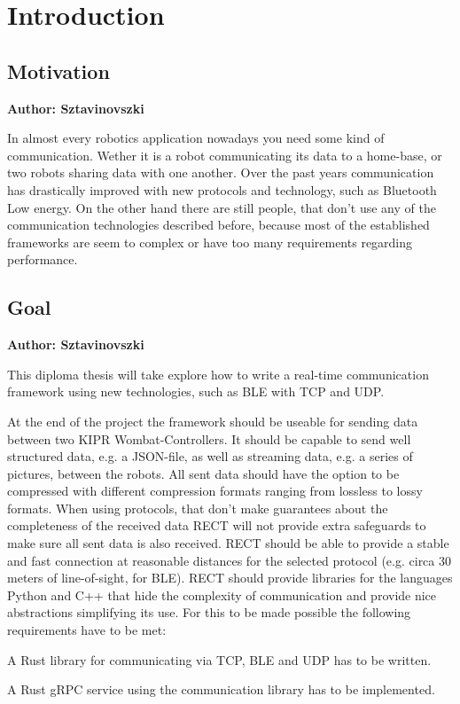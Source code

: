 \chapter{Introduction}


\vspace{2mm}

\section{Motivation}
\textbf{Author: Sztavinovszki}

In almost every robotics application nowadays you need some kind of communication. Wether it is a robot communicating
its data to a home-base, or two robots sharing data with one another. Over the past years communication has drastically
improved with new protocols and technology, such as Bluetooth Low energy. On the other hand there are still people, that
don't use any of the communication technologies described before, because most of the established frameworks are seem to
complex or have too many requirements regarding performance.

\section{Goal}
\textbf{Author: Sztavinovszki}

This diploma thesis will take explore how to write a real-time communication framework using new technologies, such as BLE with TCP
and UDP.

At the end of the project the framework should be useable for sending data between two KIPR Wombat-Controllers. It should be capable
to send well structured data, e.g. a JSON-file, as well as streaming data, e.g. a series of pictures, between the robots. All sent data should have the
option to be compressed with different compression formats ranging from lossless to lossy formats. When using protocols, that don't make guarantees about
the completeness of the received data RECT will not provide extra safeguards to make sure all sent data is also received.
RECT should be able to provide a stable and fast connection at reasonable distances for the selected protocol (e.g. circa 30 meters of line-of-sight, for BLE).
RECT should provide libraries for the languages Python and C++ that hide the complexity of communication and provide nice abstractions simplifying its use.
For this to be made possible the following requirements have to be met:
\begin{Things to be done}
\item A Rust library for communicating via TCP, BLE and UDP has to be written.
\item A Rust gRPC service using the communication library has to be implemented.
\end{Things to be done}

